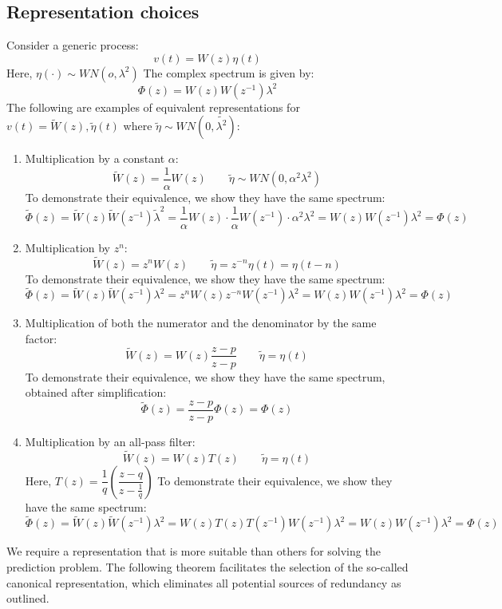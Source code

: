 \subsection{Representation choices}
Consider a generic process:
\[v(t)=W(z)\eta(t) \]
Here, $\eta(\cdot)\sim WN(o,\lambda^2)$
The complex spectrum is given by:
\[\Phi(z)=W(z)W(z^{-1})\lambda^2\]
The following are examples of equivalent representations for $v(t)=\tilde{W}(z),\tilde{\eta}(t)$ where $\tilde{\eta}\sim WN(0,\tilde{\lambda^2})$: 
\begin{enumerate}
    \item Multiplication by a constant $\alpha$:  
        \[\tilde{W}(z)=\dfrac{1}{\alpha}W(z) \qquad \tilde{\eta}\sim WN(0,\alpha^2\lambda^2)\]
        To demonstrate their equivalence, we show they have the same spectrum:
        \[\tilde{\Phi}(z)=\tilde{W}(z)\tilde{W}(z^{-1})\tilde{\lambda}^{2}=\dfrac{1}{\alpha}W(z)\cdot\dfrac{1}{\alpha}W(z^{-1})\cdot\alpha^2\lambda^2=W(z)W(z^{-1})\lambda^2=\Phi(z)\]
    \item Multiplication by $z^n$: 
        \[\tilde{W}(z)=z^nW(z) \qquad \tilde{\eta}=z^{-n}\eta(t)=\eta(t-n)\]
        To demonstrate their equivalence, we show they have the same spectrum:
        \[\tilde{\Phi}(z)=\tilde{W}(z)\tilde{W}(z^{-1})\lambda^{2}=z^nW(z)z^{-n}W(z^{-1})\lambda^2=W(z)W(z^{-1})\lambda^2=\Phi(z)\]
    \item Multiplication of both the numerator and the denominator by the same factor:
        \[\tilde{W}(z)=W(z)\dfrac{z-p}{z-p} \qquad \tilde{\eta}=\eta(t)\]
        To demonstrate their equivalence, we show they have the same spectrum, obtained after simplification:
        \[\tilde{\Phi}(z)=\dfrac{z-p}{z-p}\Phi(z)=\Phi(z)\]
    \item Multiplication by an all-pass filter:
        \[\tilde{W}(z)=W(z)T(z) \qquad \tilde{\eta}=\eta(t)\]
        Here, $T(z)=\dfrac{1}{q}\left(\dfrac{z-q}{z-\frac{1}{q}}\right)$
        To demonstrate their equivalence, we show they have the same spectrum: 
        \[\tilde{\Phi}(z)=\tilde{W}(z)\tilde{W}(z^{-1})\lambda^{2}=W(z)T(z)T(z^{-1})W(z^{-1})\lambda^2=W(z)W(z^{-1})\lambda^2=\Phi(z)\]
\end{enumerate}
We require a representation that is more suitable than others for solving the prediction problem. 
The following theorem facilitates the selection of the so-called canonical representation, which eliminates all potential sources of redundancy as outlined.
